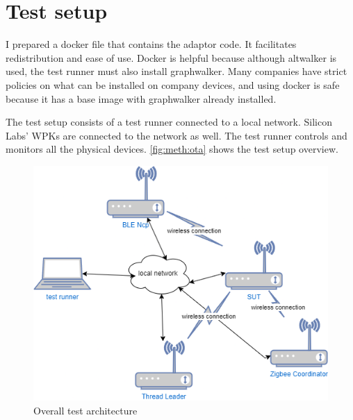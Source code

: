 \section{Test setup}
\label{sec:meth:ts}

I prepared a docker file that contains the adaptor code. It facilitates redistribution and ease of use. Docker is helpful because although altwalker is used, the test runner must also install graphwalker. Many companies have strict policies on what can be installed on company devices, and using docker is safe because it has a base image with graphwalker already installed.

The test setup consists of a test runner connected to a local network. Silicon Labs' WPKs are connected to the network as well. The test runner controls and monitors all the physical devices. \autoref{fig:meth:ota} shows the test setup overview.

\begin{figure}
    \centering
    \includegraphics[width=120mm, keepaspectratio]{figures/test_setup.png}
    \caption{Overall test architecture}
    \label{fig:meth:ota}
\end{figure}